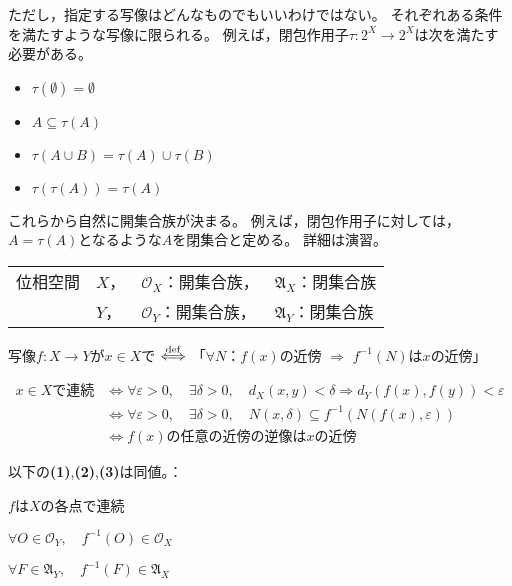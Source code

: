 \documentclass[uplatex]{jsarticle}
\begin{document}
ただし，指定する写像はどんなものでもいいわけではない。
それぞれある条件を満たすような写像に限られる。
例えば，閉包作用子$\tau \colon 2^{X} \longrightarrow 2^{X}$は次を満たす必要がある。
\begin{itemize}
  \vspace{-0.5\baselineskip}
  \item $\tau (\emptyset) = \emptyset$
  \item $A \subseteq \tau(A)$
  \item $\tau (A \cup B) = \tau (A) \cup \tau (B)$
  \item $\tau (\tau (A)) = \tau (A)$
  \vspace{-0.5\baselineskip}
\end{itemize}

これらから自然に開集合族が決まる。
例えば，閉包作用子に対しては，$A = \tau (A)$となるような$A$を閉集合と定める。
詳細は演習。

\sukima {}

\renewcommand{\arraystretch}{0.8}
\vspace{0.2\baselineskip}
\begin{tabular}{ll@{\,}l@{\,}l}
  位相空間 & $X$， & $\mathcal{O}_{X}$：開集合族， & $\mathfrak{A}_{X}$：閉集合族 \\
           & $Y$， & $\mathcal{O}_{Y}$：開集合族， & $\mathfrak{A}_{Y}$：閉集合族
\end{tabular}
\renewcommand{\arraystretch}{1}

\begin{teigi}[連続性]
  写像$f \colon X \longrightarrow Y$が$x \in X$で $\overset{\mathrm{def}}{\Longleftrightarrow}$ 
  「$\forall N$：$f(x)$の近傍 $\Longrightarrow$ $f^{-1}(N)$は$x$の近傍」
\end{teigi}

\begin{align*}
  x \in X \text{で連続} & \Longleftrightarrow \forall \varepsilon > 0, \quad \exists \delta > 0, \quad d_{X} (x,y) < \delta \Longrightarrow d_{Y}(f(x), f(y)) < \varepsilon \\
  & \Longleftrightarrow \forall \varepsilon > 0, \quad \exists \delta > 0, \quad N(x,\delta) \subseteq f^{-1} (N(f(x), \varepsilon)) \\
  & \Longleftrightarrow f(x) \text{の任意の近傍の逆像は} x \text{の近傍}
\end{align*}

\begin{teiri}
  以下の{\bf (1)},{\bf (2)},{\bf (3)}は同値。：
  
   $f$は$X$の各点で連続

   $\forall O \in \mathcal{O}_{Y}, \quad f^{-1}(O) \in \mathcal{O}_{X}$

   $\forall F \in \mathfrak{A}_{Y}, \quad f^{-1}(F) \in \mathfrak{A}_{X}$
\end{teiri}
\end{document}

